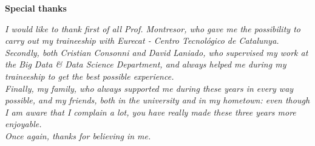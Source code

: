 \thispagestyle{empty}

\begin{center}
  {\bf \Huge Special thanks}
\end{center}

\vspace{4cm}


\emph{
  I would like to thank first of all Prof. Montresor, who gave me the possibility to carry out my traineeship with Eurecat - Centro Tecnológico de Catalunya.\\
  Secondly, both Cristian Consonni and David Laniado, who supervised my work at the Big Data \& Data Science Department, and always helped me during my traineeship to get the best possible experience.\\
  Finally, my family, who always supported me during these years in every way possible, and my friends, both in the university and in my hometown: even though I am aware that I complain a lot, you have really made these three years more enjoyable.\\
  Once again, thanks for believing in me.
}
